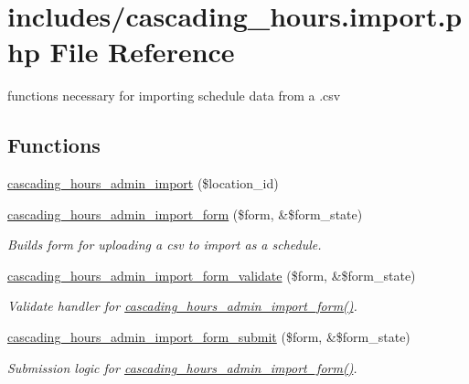 \hypertarget{cascading__hours_8import_8php}{}\section{includes/cascading\+\_\+hours.import.\+php File Reference}
\label{cascading__hours_8import_8php}


functions necessary for importing schedule data from a .csv  


\subsection*{Functions}
\begin{DoxyCompactItemize}
\item 
\hyperlink{cascading__hours_8import_8php_a9b40bb1438b71a75f27a70530506573e_a9b40bb1438b71a75f27a70530506573e}{cascading\+\_\+hours\+\_\+admin\+\_\+import} (\$location\+\_\+id)
\item 
\hyperlink{cascading__hours_8import_8php_a7841127be48fe0c9c3fc7193afffd528_a7841127be48fe0c9c3fc7193afffd528}{cascading\+\_\+hours\+\_\+admin\+\_\+import\+\_\+form} (\$form, \&\$form\+\_\+state)
\begin{DoxyCompactList}\small\item\em Builds form for uploading a csv to import as a schedule. \end{DoxyCompactList}\item 
\hyperlink{cascading__hours_8import_8php_ad3e547d19ca1eb655fbdccfd95ee8de7_ad3e547d19ca1eb655fbdccfd95ee8de7}{cascading\+\_\+hours\+\_\+admin\+\_\+import\+\_\+form\+\_\+validate} (\$form, \&\$form\+\_\+state)
\begin{DoxyCompactList}\small\item\em Validate handler for \hyperlink{cascading__hours_8import_8php_a7841127be48fe0c9c3fc7193afffd528_a7841127be48fe0c9c3fc7193afffd528}{cascading\+\_\+hours\+\_\+admin\+\_\+import\+\_\+form()}. \end{DoxyCompactList}\item 
\hyperlink{cascading__hours_8import_8php_abcbb13992846821794f6280ccd243dac_abcbb13992846821794f6280ccd243dac}{cascading\+\_\+hours\+\_\+admin\+\_\+import\+\_\+form\+\_\+submit} (\$form, \&\$form\+\_\+state)
\begin{DoxyCompactList}\small\item\em Submission logic for \hyperlink{cascading__hours_8import_8php_a7841127be48fe0c9c3fc7193afffd528_a7841127be48fe0c9c3fc7193afffd528}{cascading\+\_\+hours\+\_\+admin\+\_\+import\+\_\+form()}. \end{DoxyCompactList}\item 

\end{DoxyCompactItemize}
